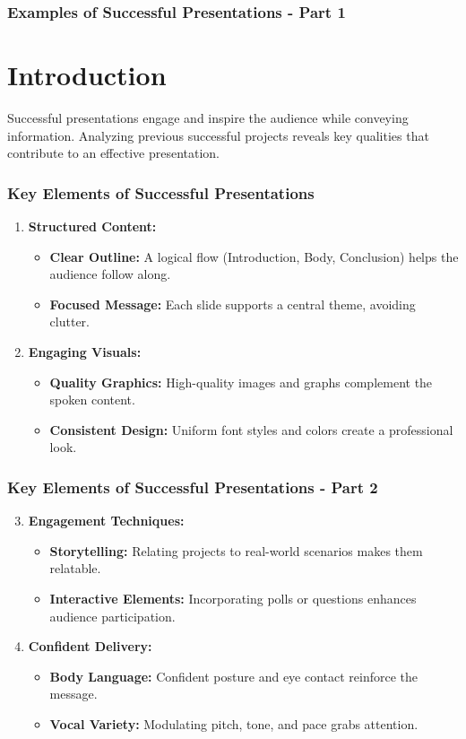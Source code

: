 \documentclass[aspectratio=169]{beamer}
\begin{document}
\begin{frame}[fragile]
    \frametitle{Examples of Successful Presentations - Part 1}
    \section*{Introduction}
    Successful presentations engage and inspire the audience while conveying information. Analyzing previous successful projects reveals key qualities that contribute to an effective presentation.
\end{frame}

\begin{frame}[fragile]
    \frametitle{Key Elements of Successful Presentations}
    \begin{enumerate}
        \item \textbf{Structured Content:}
        \begin{itemize}
            \item \textbf{Clear Outline:} A logical flow (Introduction, Body, Conclusion) helps the audience follow along.
            \item \textbf{Focused Message:} Each slide supports a central theme, avoiding clutter.
        \end{itemize}
        \item \textbf{Engaging Visuals:}
        \begin{itemize}
            \item \textbf{Quality Graphics:} High-quality images and graphs complement the spoken content.
            \item \textbf{Consistent Design:} Uniform font styles and colors create a professional look.
        \end{itemize}
    \end{enumerate}
\end{frame}

\begin{frame}[fragile]
    \frametitle{Key Elements of Successful Presentations - Part 2}
    \begin{enumerate}
        \setcounter{enumi}{2}
        \item \textbf{Engagement Techniques:}
        \begin{itemize}
            \item \textbf{Storytelling:} Relating projects to real-world scenarios makes them relatable.
            \item \textbf{Interactive Elements:} Incorporating polls or questions enhances audience participation.
        \end{itemize}
        \item \textbf{Confident Delivery:}
        \begin{itemize}
            \item \textbf{Body Language:} Confident posture and eye contact reinforce the message.
            \item \textbf{Vocal Variety:} Modulating pitch, tone, and pace grabs attention.
        \end{itemize}
    \end{enumerate}
\end{frame}
\end{document}
